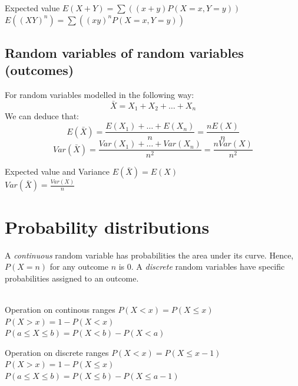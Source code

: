 \documentclass{article}
\begin{document}
\begin{propBox}[]{Expected value}
    $E(X+Y)   = \sum((x+y) P(X=x, Y=y))$\\
    $E((XY)^n) = \sum((xy)^n P(X=x, Y=y))$
\end{propBox}

\subsection{Random variables of random variables (outcomes)}
For random variables modelled in the following way:
\[\bar{X}=X_1+X_2+\dots+X_n\]
We can deduce that:
\[E(\bar{X})=\frac{E(X_1)+\dots+E(X_n)}{n}=\frac{nE(X)}{n}\]
\[Var(\bar{X})=\frac{Var(X_1)+\dots+Var(X_n)}{n^2}=\frac{nVar(X)}{n^2}\]

\begin{propBox}[]{Expected value and Variance}
    $E(\bar{X})   = E(X)$\\
    $Var(\bar{X}) = \frac{Var(X)}{n}$
\end{propBox}

\section{Probability distributions}
A \emph{continuous} random variable has probabilities the area under its curve. Hence, $P(X=n)$ for any outcome $n$ is $0$. A \emph{discrete} random variables have specific probabilities assigned to an outcome.\\
\\
\begin{minipage}{0.45\textwidth}
    \begin{knBox}[]{Operation on continous ranges}
        $P(X<x)=P(X\leq x)$\\
        $P(X>x)=1 - P(X<x)$\\
        $P(a\leq X\leq b)=P(X<b)-P(X<a)$
    \end{knBox}
\end{minipage}
\hfill 
\begin{minipage}{0.45\textwidth}
    \begin{knBox}[]{Operation on discrete ranges}
        $P(X<x)=P(X\leq x-1)$\\
        $P(X>x)=1-P(X\leq x)$\\
        $P(a\leq X\leq b)=P(X\leq b)-P(X\leq a-1)$
    \end{knBox}
\end{minipage}
\end{document}
